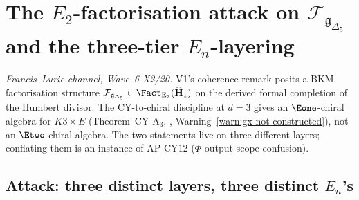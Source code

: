 
\section{The $E_2$-factorisation attack on
$\mathcal F_{\mathfrak g_{\Delta_5}}$ and the three-tier
$E_n$-layering}
\label{sec:wave6-e2-fact-attack-heal-x2}

\emph{Francis--Lurie channel, Wave~6 X2/20.} V1's coherence
remark  posits a
BKM factorisation structure
$\mathcal F_{\mathfrak g_{\Delta_5}} \in
\Fact_{\mathrm E_2}(\widehat{\mathbf H}_1)$
on the derived formal completion of the Humbert divisor. The
CY-to-chiral discipline at $d = 3$ gives an $\Eone$-chiral
algebra for $K3 \times E$ (Theorem~CY-A$_3$,
,
Warning~\ref{warn:gx-not-constructed}), not an $\Etwo$-chiral
algebra. The two statements live on three different layers;
conflating them is an instance of AP-CY$12$
($\Phi$-output-scope confusion).

\subsection{Attack: three distinct layers, three distinct $E_n$'s}
\label{subsec:wave6-x2-attack}

